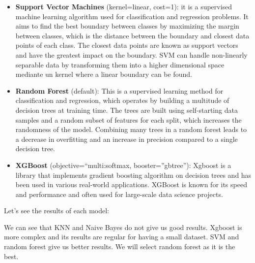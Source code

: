 \documentclass[
]{article}
\begin{document}
\begin{itemize}
\item
  \textbf{Support Vector Machines} (kernel=linear, cost=1): it is a
  supervised machine learning algorithm used for classification and
  regression problems. It aims to find the best boundary between classes
  by maximizing the margin between classes, which is the distance
  between the boundary and closest data points of each class. The
  closest data points are known as support vectors and have the greatest
  impact on the boundary. SVM can handle non-linearly separable data by
  transforming them into a higher dimensional space mediante un kernel
  where a linear boundary can be found.
\item
  \textbf{Random Forest} (default): This is a supervised learning method
  for classification and regression, which operates by building a
  multitude of decision trees at training time. The trees are built
  using self-starting data samples and a random subset of features for
  each split, which increases the randomness of the model. Combining
  many trees in a random forest leads to a decrease in overfitting and
  an increase in precision compared to a single decision tree.
\item
  \textbf{XGBoost} (objective=``multi:softmax, booster=''gbtree''):
  Xgboost is a library that implements gradient boosting algorithm on
  decision trees and has been used in various real-world applications.
  XGBoost is known for its speed and performance and often used for
  large-scale data science projects.
\end{itemize}

Let's see the results of each model:

\scriptsize


\normalsize We can see that KNN and Naive Bayes do not give us good
results. Xgboost is more complex and its results are regular for having
a small dataset. SVM and random forest give us better results. We will
select random forest as it is the best.
\end{document}
